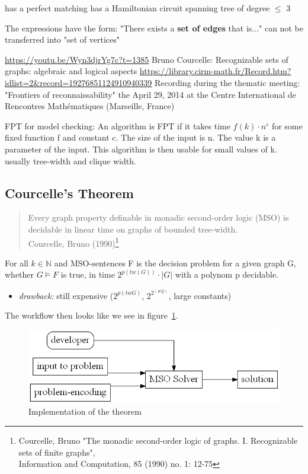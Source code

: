 \documentclass[a4paper, 12pt]{scrartcl}
\begin{document}
has a perfect matching
has a Hamiltonian circuit
spanning tree of degree $\le$ 3

The expressions have the form: "There exists a \textbf{set of edges} that is..." can not be transferred into "set of vertices"

\url{https://youtu.be/Wyn3djrYg7c?t=1385} Bruno Courcelle: Recognizable sets of graphs: algebraic and logical aspects 
\url{https://library.cirm-math.fr/Record.htm?idlist=2&record=19276851124910940339}
Recording during the thematic meeting: "Frontiers of reconnaissability" the April 29, 2014 at the Centre International de Rencontres Mathématiques (Marseille, France)

FPT for model checking:
An algorithm is FPT if it takes time $f(k)\cdot n^{c}$ for some fixed function f and constant c. The size of the input is n. 
The value k is a parameter of the input. 
This algorithm is then usable for small values of k. usually tree-width and clique width.

\subsection{Courcelle's Theorem}
\begin{quotation}
	Every graph property definable in monadic second-order logic (MSO) is decidable in linear time on graphs of bounded tree-width.\\
	{\small Courcelle, Bruno (1990)}\footnote{Courcelle, Bruno "The monadic second-order logic of graphs. I. Recognizable sets of finite graphs",\\ Information and Computation, 85 (1990) no. 1: 12-75}
\end{quotation}

For all $k \in \mathbb{N}$ and MSO-sentences F is the decision problem for a given graph G, whether $G \models F$ is true, in time $2^{p(tw(G))} \cdot |G|$ with a polynom p decidable.
\begin{itemize}
	
	\item \emph{drawback:} still expensive ($2^{p(tw G)}$, $2^{2^{(\#Q)}}$, large constants) \smallskip 
	
\end{itemize}

The workflow then looks like we see in figure~\ref{fig:UsageCourcelle}.

\begin{figure}[H]
	\includegraphics[height=0.2\textheight]{images/UsageCourcelle.gv.png}
	\caption{Implementation of the theorem}
	\label{fig:UsageCourcelle}
\end{figure}
\end{document}
